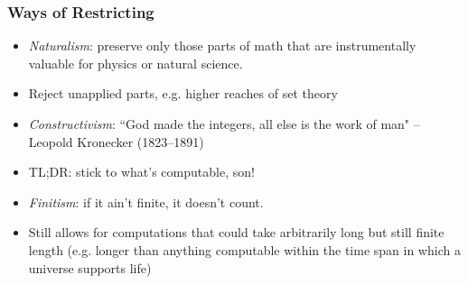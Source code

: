 \begin{frame}
\frametitle{Ways of Restricting}

\begin{itemize}[<+->]

\item \emph{Naturalism}: preserve only those parts of math that are instrumentally valuable for physics or natural science. 
\item[] Reject unapplied parts, e.g. higher reaches of set theory 

\medskip 

\item \emph{Constructivism}: ``God made the integers, all else is the work of man" -- Leopold Kronecker (1823--1891)

\bi
\item TL;DR: stick to what's computable, son!
\ei

\medskip 

\item \emph{Finitism}: if it ain't finite, it doesn't count. 
\item[] Still allows for computations that could take arbitrarily long but still finite length (e.g. longer than anything computable within the time span in which a universe supports life)

\end{itemize}
\end{frame}

